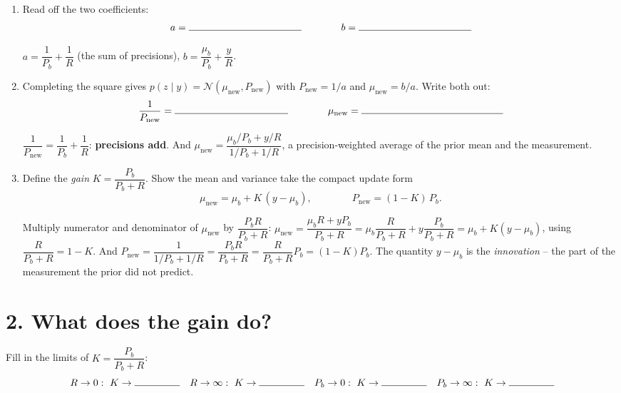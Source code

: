 \documentclass[11pt]{article}
\begin{document}
\begin{enumerate}
  \item Read off the two coefficients:
  \[
    a = \rule{4cm}{0.4pt}
    \qquad\qquad
    b = \rule{4cm}{0.4pt}
  \]

  \begin{solution}
  $a = \dfrac{1}{P_b} + \dfrac{1}{R}$ \quad(the sum of precisions), \qquad
  $b = \dfrac{\mu_b}{P_b} + \dfrac{y}{R}$.
  \end{solution}

  \item Completing the square gives $p(z\mid y)=\mathcal{N}(\mu_{\text{new}},
  P_{\text{new}})$ with $P_{\text{new}} = 1/a$ and $\mu_{\text{new}} = b/a$. Write
  both out:
  \[
    \frac{1}{P_{\text{new}}} = \rule{4cm}{0.4pt}
    \qquad\qquad
    \mu_{\text{new}} = \rule{5cm}{0.4pt}
  \]

  \begin{solution}
  $\dfrac{1}{P_{\text{new}}} = \dfrac{1}{P_b} + \dfrac{1}{R}$: \textbf{precisions
  add}. And $\mu_{\text{new}} = \dfrac{\mu_b/P_b + y/R}{1/P_b + 1/R}$, a
  precision-weighted average of the prior mean and the measurement.
  \end{solution}

  \item Define the \emph{gain} $K = \dfrac{P_b}{P_b+R}$. Show the mean and variance
  take the compact update form
  \[
    \mu_{\text{new}} = \mu_b + K\,(y-\mu_b),
    \qquad\qquad
    P_{\text{new}} = (1-K)\,P_b .
  \]

  \begin{solution}
  Multiply numerator and denominator of $\mu_{\text{new}}$ by $\dfrac{P_bR}{P_b+R}$:
  $\mu_{\text{new}} = \dfrac{\mu_b R + y P_b}{P_b+R}
   = \mu_b\dfrac{R}{P_b+R} + y\dfrac{P_b}{P_b+R}
   = \mu_b + K(y-\mu_b)$, using $\dfrac{R}{P_b+R}=1-K$. And
  $P_{\text{new}} = \dfrac{1}{1/P_b+1/R} = \dfrac{P_bR}{P_b+R}
   = \dfrac{R}{P_b+R}P_b = (1-K)P_b$. The quantity $y-\mu_b$ is the
  \emph{innovation} -- the part of the measurement the prior did not predict.
  \end{solution}
\end{enumerate}

\section*{2. What does the gain do?}

Fill in the limits of $K = \dfrac{P_b}{P_b+R}$:
\[
  R\to 0:\ K\to \rule{1.6cm}{0.4pt}
  \quad
  R\to\infty:\ K\to \rule{1.6cm}{0.4pt}
  \quad
  P_b\to 0:\ K\to \rule{1.6cm}{0.4pt}
  \quad
  P_b\to\infty:\ K\to \rule{1.6cm}{0.4pt}
\]
\end{document}
